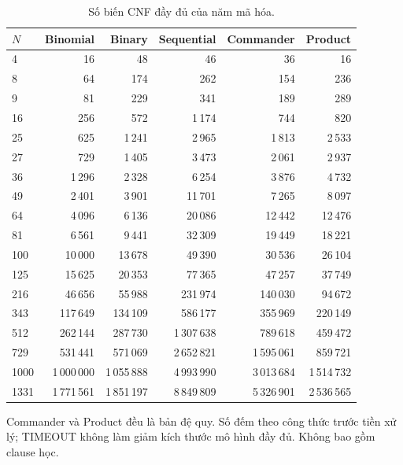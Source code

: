 \begin{table}[pos=H]
\centering
\footnotesize
\caption{Số biến CNF đầy đủ của năm mã hóa.}
\label{tab:variables}
\setlength{\tabcolsep}{4pt}
\begin{tabular}{@{}lrrrrr@{}}
\toprule
$N$ & Binomial & Binary & Sequential & Commander & Product \\
\midrule
4 & 16 & 48 & 46 & 36 & 16 \\
8 & 64 & 174 & 262 & 154 & 236 \\
9 & 81 & 229 & 341 & 189 & 289 \\
16 & 256 & 572 & 1\,174 & 744 & 820 \\
25 & 625 & 1\,241 & 2\,965 & 1\,813 & 2\,533 \\
27 & 729 & 1\,405 & 3\,473 & 2\,061 & 2\,937 \\
36 & 1\,296 & 2\,328 & 6\,254 & 3\,876 & 4\,732 \\
49 & 2\,401 & 3\,901 & 11\,701 & 7\,265 & 8\,097 \\
64 & 4\,096 & 6\,136 & 20\,086 & 12\,442 & 12\,476 \\
81 & 6\,561 & 9\,441 & 32\,309 & 19\,449 & 18\,221 \\
100 & 10\,000 & 13\,678 & 49\,390 & 30\,536 & 26\,104 \\
125 & 15\,625 & 20\,353 & 77\,365 & 47\,257 & 37\,749 \\
216 & 46\,656 & 55\,988 & 231\,974 & 140\,030 & 94\,672 \\
343 & 117\,649 & 134\,109 & 586\,177 & 355\,969 & 220\,149 \\
512 & 262\,144 & 287\,730 & 1\,307\,638 & 789\,618 & 459\,472 \\
729 & 531\,441 & 571\,069 & 2\,652\,821 & 1\,595\,061 & 859\,721 \\
1000 & 1\,000\,000 & 1\,055\,888 & 4\,993\,990 & 3\,013\,684 & 1\,514\,732 \\
1331 & 1\,771\,561 & 1\,851\,197 & 8\,849\,809 & 5\,326\,901 & 2\,536\,565 \\
\bottomrule
\end{tabular}
\par\smallskip\begin{minipage}{\linewidth}\footnotesize Commander và Product đều là bản đệ quy. Số đếm theo công thức trước tiền xử lý; TIMEOUT không làm giảm kích thước mô hình đầy đủ. Không bao gồm clause học.\end{minipage}
\end{table}
